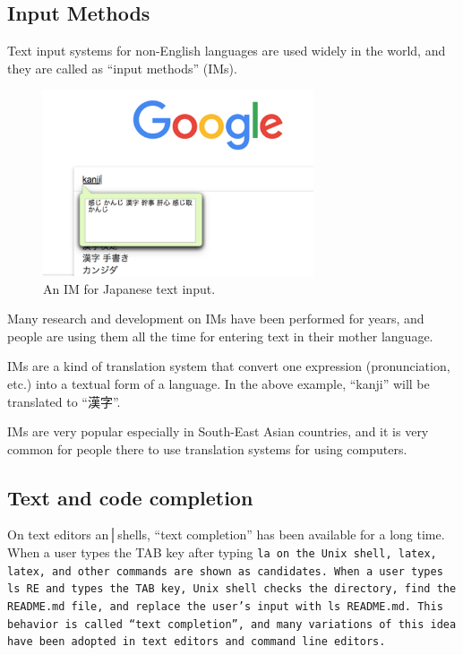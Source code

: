 \documentclass{sigchi}
\begin{document}
\subsection{Input Methods}

Text input systems for non-English languages are used widely in the world, and
they are called as ``input methods'' (IMs).

\begin{figure}[h]
  \includegraphics[width=8cm,bb=0 0 976 670]{figures/nyuuryoku-ime.png}
  \caption{An IM for Japanese text input.}
  \label{bash1}
\end{figure}

Many research and development on IMs have been performed for years, and
people are using them all the time for entering text in their mother language.

IMs are a kind of translation system that convert one
expression (pronunciation, etc.) into a textual form of a language.
In the above example, ``kanji'' will be translated to ``漢字''.

IMs are very popular especially in South-East Asian countries, and
it is very common for people there to 
use translation systems for using computers.

\subsection{Text and code completion}

On text editors an│shells,
``text completion'' has been available for a long time.
%
When a user types the TAB key after typing \tt{la} on the Unix shell,
\tt{latex}, \tt{latex}, and other commands are shown as candidates.
When a user types \tt{ls RE} and types the TAB key,
Unix shell checks the directory, find the \texttt{README.md} file, and
replace the user's input with \tt{ls README.md}.
This behavior is called ``text completion'', and many variations of
this idea have been adopted in text editors and command line editors.
\end{document}
